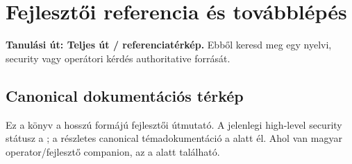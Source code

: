 \chapter{Fejlesztői referencia és továbblépés}

\noindent\textbf{Tanulási út: Teljes út / referenciatérkép.} Ebből keresd meg egy nyelvi, security vagy operátori kérdés authoritative forrását.\par\medskip

\section{Canonical dokumentációs térkép}

Ez a könyv a hosszú formájú fejlesztői útmutató. A jelenlegi high-level security státusz a ; a részletes canonical témadokumentáció a  alatt él. Ahol van magyar operator/fejlesztő companion, az a  alatt található.

